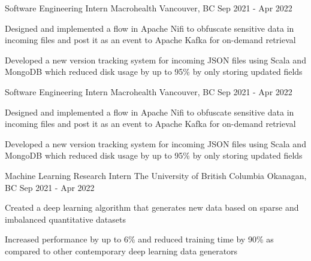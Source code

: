 

\begin{cventries}

  \cventry
    {Software Engineering Intern} %
    {Macrohealth} %
    {Vancouver, BC} %
    {Sep 2021 - Apr 2022} %
    {
      \begin{cvitems} %
      \item Designed and implemented a flow in Apache Nifi to obfuscate sensitive data in incoming files and post it as an event to Apache Kafka for on-demand retrieval 
      \item Developed a new version tracking system for incoming JSON files using Scala and MongoDB which reduced disk usage by up to 95\% by only storing updated fields
      \end{cvitems}
    }
  \cventry
    {Software Engineering Intern} %
    {Macrohealth} %
    {Vancouver, BC} %
    {Sep 2021 - Apr 2022} %
    {
      \begin{cvitems} %
      \item Designed and implemented a flow in Apache Nifi to obfuscate sensitive data in incoming files and post it as an event to Apache Kafka for on-demand retrieval 
      \item Developed a new version tracking system for incoming JSON files using Scala and MongoDB which reduced disk usage by up to 95\% by only storing updated fields
      \end{cvitems}
    }
  \cventry
    {Machine Learning Research Intern} %
    {The University of British Columbia} %
    {Okanagan, BC} %
    {Sep 2021 - Apr 2022} %
    {
      \begin{cvitems} %
      \item Created a deep learning algorithm that generates new data based on sparse and imbalanced quantitative datasets
      \item Increased performance by up to 6\% and reduced training time by 90\% as compared to other contemporary deep learning data generators
      \end{cvitems}
    }
\end{cventries}
